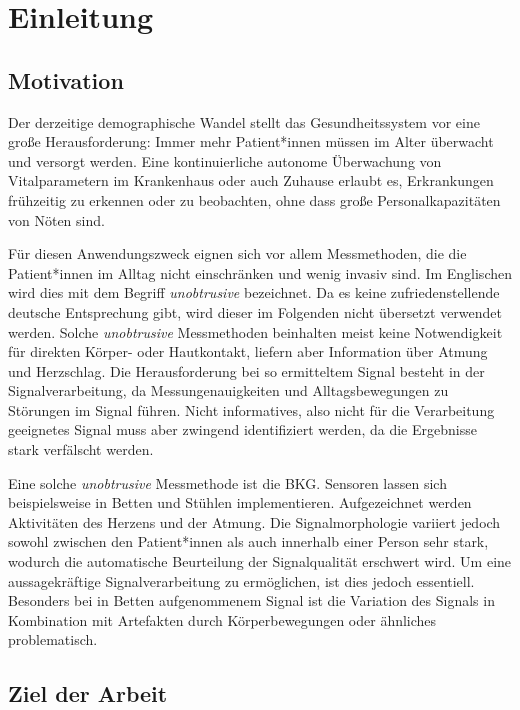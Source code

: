 \chapter{Einleitung}\label{einleitung}

\section{Motivation}

Der derzeitige demographische Wandel stellt das Gesundheitssystem vor eine große Herausforderung: Immer mehr Patient*innen müssen im Alter überwacht und versorgt werden. Eine kontinuierliche autonome Überwachung von Vitalparametern im Krankenhaus oder auch Zuhause erlaubt es, Erkrankungen frühzeitig zu erkennen oder zu beobachten, ohne dass große Personalkapazitäten von Nöten sind.

Für diesen Anwendungszweck eignen sich vor allem Messmethoden, die die Patient*innen im Alltag nicht einschränken und wenig invasiv sind. Im Englischen wird dies mit dem Begriff \textit{unobtrusive} bezeichnet. Da es keine zufriedenstellende deutsche Entsprechung gibt, wird dieser im Folgenden nicht übersetzt verwendet werden. Solche \textit{unobtrusive} Messmethoden beinhalten meist keine Notwendigkeit für direkten Körper- oder Hautkontakt, liefern aber Information über Atmung und Herzschlag. Die Herausforderung bei so ermitteltem Signal besteht in der Signalverarbeitung, da Messungenauigkeiten und Alltagsbewegungen zu Störungen im Signal führen. Nicht informatives, also nicht für die Verarbeitung geeignetes Signal muss aber zwingend identifiziert werden, da die Ergebnisse stark verfälscht werden.

Eine solche \textit{unobtrusive} Messmethode ist die \acf{BKG}. Sensoren lassen sich beispielsweise in Betten und Stühlen implementieren. Aufgezeichnet werden Aktivitäten des Herzens und der Atmung. Die Signalmorphologie variiert jedoch sowohl zwischen den Patient*innen als auch innerhalb einer Person sehr stark, wodurch die automatische Beurteilung der Signalqualität erschwert wird. Um eine aussagekräftige Signalverarbeitung zu ermöglichen, ist dies jedoch essentiell. Besonders bei in Betten aufgenommenem Signal ist die Variation des Signals in Kombination mit Artefakten durch Körperbewegungen oder ähnliches problematisch.  
 

\section{Ziel der Arbeit}

